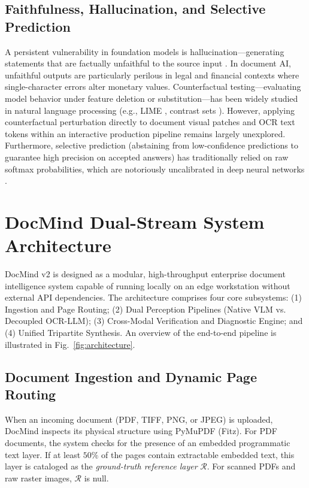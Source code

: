 \documentclass[conference]{IEEEtran}
\begin{document}
\subsection{Faithfulness, Hallucination, and Selective Prediction}
A persistent vulnerability in foundation models is hallucination---generating statements that are factually unfaithful to the source input \cite{b9, b13}. In document AI, unfaithful outputs are particularly perilous in legal and financial contexts where single-character errors alter monetary values. Counterfactual testing---evaluating model behavior under feature deletion or substitution---has been widely studied in natural language processing (e.g., LIME \cite{b22}, contrast sets \cite{b23}). However, applying counterfactual perturbation directly to document visual patches and OCR text tokens within an interactive production pipeline remains largely unexplored. Furthermore, selective prediction (abstaining from low-confidence predictions to guarantee high precision on accepted answers) \cite{b24} has traditionally relied on raw softmax probabilities, which are notoriously uncalibrated in deep neural networks \cite{b25}.

\section{DocMind Dual-Stream System Architecture}

DocMind v2 is designed as a modular, high-throughput enterprise document intelligence system capable of running locally on an edge workstation without external API dependencies. The architecture comprises four core subsystems: (1) Ingestion and Page Routing; (2) Dual Perception Pipelines (Native VLM vs. Decoupled OCR-LLM); (3) Cross-Modal Verification and Diagnostic Engine; and (4) Unified Tripartite Synthesis. An overview of the end-to-end pipeline is illustrated in Fig.~\ref{fig:architecture}.

\subsection{Document Ingestion and Dynamic Page Routing}
When an incoming document (PDF, TIFF, PNG, or JPEG) is uploaded, DocMind inspects its physical structure using PyMuPDF (Fitz). For PDF documents, the system checks for the presence of an embedded programmatic text layer. If at least $50\%$ of the pages contain extractable embedded text, this layer is cataloged as the \textit{ground-truth reference layer} $\mathcal{R}$. For scanned PDFs and raw raster images, $\mathcal{R}$ is null.
\end{document}
